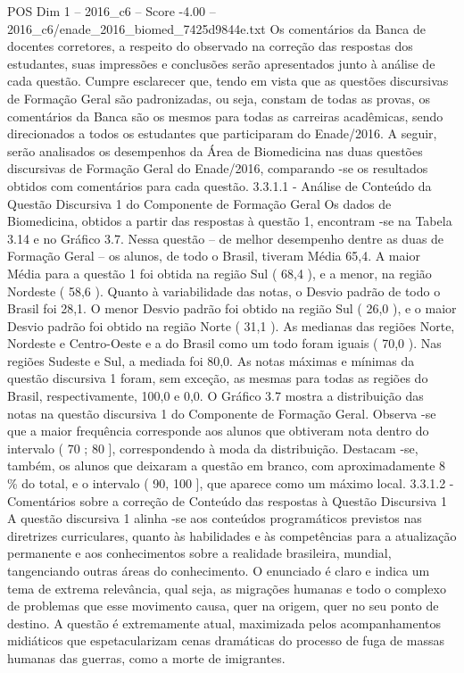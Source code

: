 \begin{textsample}{POS Dim 1 – 2016\_c6 – Score -4.00 – 2016\_c6/enade\_2016\_biomed\_7425d9844e.txt}
Os comentários da Banca de docentes corretores, a respeito do observado na correção das respostas dos estudantes, suas impressões e conclusões serão apresentados junto à análise de cada questão.
Cumpre esclarecer que, tendo em vista que as questões discursivas de Formação Geral são padronizadas, ou seja, constam de todas as provas, os comentários da Banca são os mesmos para todas as carreiras acadêmicas, sendo direcionados a todos os estudantes que participaram do Enade/2016.
A seguir, serão analisados os desempenhos da Área de Biomedicina nas duas questões discursivas de Formação Geral do Enade/2016, comparando -se os resultados obtidos com comentários para cada questão. 3.3.1.1 - Análise de Conteúdo da Questão Discursiva 1 do Componente de Formação Geral Os dados de Biomedicina, obtidos a partir das respostas à questão 1, encontram -se na Tabela 3.14 e no Gráfico 3.7.
Nessa questão – de melhor desempenho dentre as duas de Formação Geral – os alunos, de todo o Brasil, tiveram Média 65,4.
A maior Média para a questão 1 foi obtida na região Sul ( 68,4 ), e a menor, na região Nordeste ( 58,6 ).
Quanto à variabilidade das notas, o Desvio padrão de todo o Brasil foi 28,1.
O menor Desvio padrão foi obtido na região Sul ( 26,0 ), e o maior Desvio padrão foi obtido na região Norte ( 31,1 ).
As medianas das regiões Norte, Nordeste e Centro-Oeste e a do Brasil como um todo foram iguais ( 70,0 ).
Nas regiões Sudeste e Sul, a mediada foi 80,0.
As notas máximas e mínimas da questão discursiva 1 foram, sem exceção, as mesmas para todas as regiões do Brasil, respectivamente, 100,0 e 0,0.
O Gráfico 3.7 mostra a distribuição das notas na questão discursiva 1 do Componente de Formação Geral.
Observa -se que a maior frequência corresponde aos alunos que obtiveram nota dentro do intervalo ( 70 ; 80 ], correspondendo à moda da distribuição.
Destacam -se, também, os alunos que deixaram a questão em branco, com aproximadamente 8 \% do total, e o intervalo ( 90, 100 ], que aparece como um máximo local. 3.3.1.2 - Comentários sobre a correção de Conteúdo das respostas à Questão Discursiva 1 A questão discursiva 1 alinha -se aos conteúdos programáticos previstos nas diretrizes curriculares, quanto às habilidades e às competências para a atualização permanente e aos conhecimentos sobre a realidade brasileira, mundial, tangenciando outras áreas do conhecimento.
O enunciado é claro e indica um tema de extrema relevância, qual seja, as migrações humanas e todo o complexo de problemas que esse movimento causa, quer na origem, quer no seu ponto de destino.
A questão é extremamente atual, maximizada pelos acompanhamentos midiáticos que espetacularizam cenas dramáticas do processo de fuga de massas humanas das guerras, como a morte de imigrantes.

\end{textsample}
